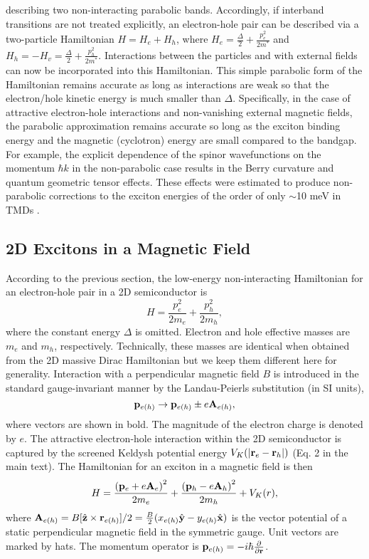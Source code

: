 \documentclass[aps,prl,twocolumn]{revtex4-1}
\begin{document}
%
describing two non-interacting parabolic bands. Accordingly, if interband transitions are not treated explicitly, an electron-hole pair can be described via a two-particle Hamiltonian $H=H_e+H_h$, where $H_e=\frac{\Delta}{2}+\frac{p_e^2}{2m^*}$ and $H_h=-H_v=\frac{\Delta}{2}+\frac{p_h^2}{2m^*}$. Interactions between the particles and with external fields can now be incorporated into this Hamiltonian. This simple parabolic form of the Hamiltonian remains accurate as long as interactions are weak so that the electron/hole kinetic energy is much smaller than $\Delta$. Specifically, in the case of attractive electron-hole interactions and non-vanishing external magnetic fields, the parabolic approximation remains accurate so long as the exciton binding energy and the magnetic (cyclotron) energy are small compared to the bandgap. For example, the explicit dependence of the spinor wavefunctions on the momentum $\hbar k$ in the non-parabolic case results in the Berry curvature and quantum geometric tensor effects. These effects were estimated to produce non-parabolic corrections to the exciton energies of the order of only $\sim$10 meV in TMDs \cite{Imamoglu,Xiao2015}.

\subsection{2D Excitons in a Magnetic Field}

According to the previous section, the low-energy non-interacting Hamiltonian for an electron-hole pair in a 2D semiconductor is
%
\begin{equation}
H=\frac{p_e^{2}}{2m_{e}}+\frac{p_h^{2}}{2m_{h}},
\end{equation}
%
where the constant energy $\Delta$ is omitted. Electron and hole effective masses are $m_{e}$ and $m_{h}$, respectively.  Technically, these masses are identical when obtained from the 2D massive Dirac Hamiltonian but we keep them different here for
generality. Interaction with a perpendicular magnetic field $B$ is introduced in the standard gauge-invariant manner by the Landau-Peierls substitution (in SI units),
%
\begin{equation}
{\bf p}_{e(h)}\rightarrow {\bf p}_{e(h)}\pm e{\bf A}_{e(h)},
\end{equation}
%
where vectors are shown in bold. The magnitude of the electron charge is denoted by $e$. 
The attractive electron-hole interaction within the 2D semiconductor is captured by the screened Keldysh potential energy $V_K(|{\bf r}_e-{\bf r}_h|)$ (Eq. 2 in the main text).  The Hamiltonian for an exciton in a magnetic field is then
%
\begin{equation}
H=\frac{\left({\bf p}_{e}+e{\bf A}_{e}\right)^{2}}{2m_{e}}+\frac{\left({\bf p}_{h}-e{\bf A}_{h}\right)^{2}}{2m_{h}}+V_K(r),
\end{equation}
%
where ${\bf A}_{e(h)}=B[\hat{{\bf z}}\times{\bf r}_{e(h)}]/2=\frac{B}{2}(x_{e(h)}\hat{{\bf y}}-y_{e(h)}\hat{{\bf x}})$
is the vector potential of a static perpendicular magnetic field in
the symmetric gauge. Unit vectors are marked by hats. The momentum operator is ${\bf p}_{e(h)}=-i\hbar\frac{\partial}{\partial{\bf r}}$. 
\end{document}
